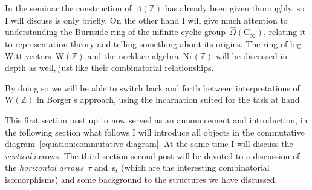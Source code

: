 In the seminar the construction of~$\Lambda(\mathbb{Z})$ has already been given thoroughly, so I will discuss is only briefly. On the other hand I will give much attention to understanding the Burnside ring of the infinite cyclic group~$\hat{\Omega}(\mathrm{C}_\infty)$, relating it to representation theory and telling something about its origins. The ring of big Witt vectors~$\mathrm{W}(\mathbb{Z})$ and the necklace algebra~$\mathrm{Nr}(\mathbb{Z})$ will be discussed in depth as well, just like their combinatorial relationships.

By doing so we will be able to switch back and forth between interpretations of~$\mathrm{W}(\mathbb{Z})$ in Borger's approach, using the incarnation suited for the task at hand.

This first \iftex section \fi\ifblog post up to now \fi served as an announcement and introduction, in \iftex the following section \fi\ifblog what follows \fi I will introduce all objects in the commutative diagram~\eqref{equation:commutative-diagram}. At the same time I will discuss the \emph{vertical} arrows. The \iftex third section \fi\ifblog second post \fi will be devoted to a discussion of the \emph{horizontal arrows}~$\tau$ and~$\mathrm{s}_t$ (which are the interesting combinatorial isomorphisms) and some background to the structures we have discussed.

